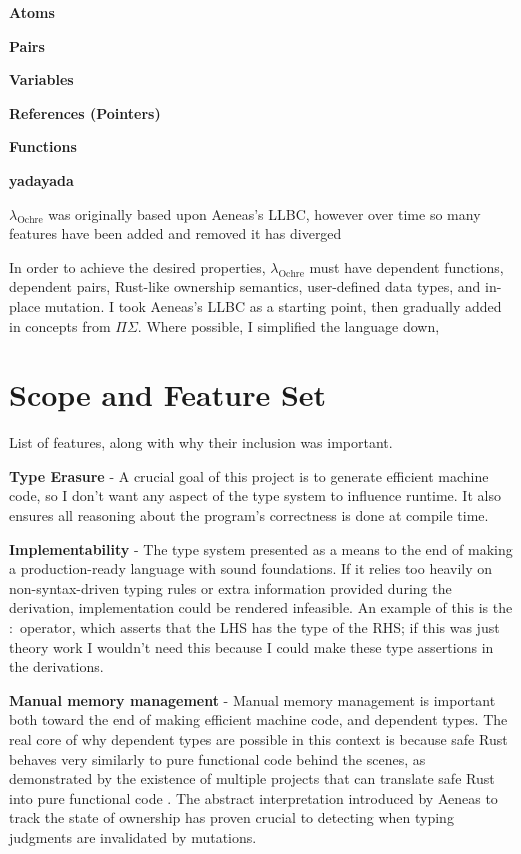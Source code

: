 \documentclass[12pt,twoside]{report}
\newcommand{\lochre}{$\lambda_\text{Ochre}$}
\begin{document}
\textbf{Atoms}

\textbf{Pairs}

\textbf{Variables}

\textbf{References (Pointers)}

\textbf{Functions}

\textbf{yadayada}

\lochre{} was originally based upon Aeneas's \cite{aeneas} LLBC, however over time so many features have been added and removed it has diverged 

In order to achieve the desired properties, \lochre{} must have dependent functions, dependent pairs, Rust-like ownership semantics, user-defined data types, and in-place mutation. I took Aeneas's LLBC as a starting point, then gradually added in concepts from $\Pi\Sigma$\cite{altenkirch2010pisigma}. Where possible, I simplified the language down, 



\section{Scope and Feature Set}
List of features, along with why their inclusion was important.

\textbf{Type Erasure} - A crucial goal of this project is to generate efficient machine code, so I don't want any aspect of the type system to influence runtime. It also ensures all reasoning about the program's correctness is done at compile time.

\textbf{Implementability} - The type system presented as a means to the end of making a production-ready language with sound foundations. If it relies too heavily on non-syntax-driven typing rules or extra information provided during the derivation, implementation could be rendered infeasible. An example of this is the $:$ operator, which asserts that the LHS has the type of the RHS; if this was just theory work I wouldn't need this because I could make these type assertions in the derivations.

\textbf{Manual memory management} - Manual memory management is important both toward the end of making efficient machine code, and dependent types. The real core of why dependent types are possible in this context is because safe Rust behaves very similarly to pure functional code behind the scenes, as demonstrated by the existence of multiple projects that can translate safe Rust into pure functional code \cite{aeneas}\cite{ullrichKhaElectrolysis2024}. The abstract interpretation introduced by Aeneas to track the state of ownership has proven crucial to detecting when typing judgments are invalidated by mutations.
\end{document}
